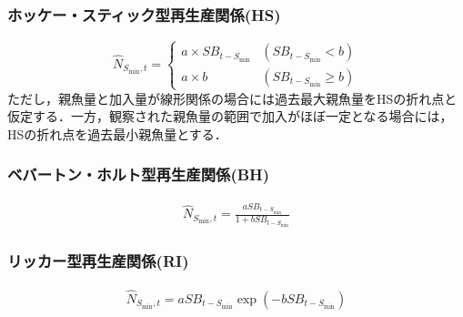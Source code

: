 \documentclass[11pt]{jsarticle}
\begin{document}
\subsubsection*{ホッケー・スティック型再生産関係(HS)}
\begin{equation}
  \hat{N}_{S_{\mathrm{min}},t} = \begin{cases}
    a \times S\!B_{t-S_{\mathrm{min}}} & (S\!B_{t-S_{\mathrm{min}}} < b) \\
    a \times b                 & (S\!B_{t-S_{\mathrm{min}}} \geq b)
  \end{cases}
  \label{HS}
\end{equation}
ただし，親魚量と加入量が線形関係の場合には過去最大親魚量をHSの折れ点と仮定する．一方，観察された親魚量の範囲で加入がほぼ一定となる場合には，HSの折れ点を過去最小親魚量とする．

\subsubsection*{ベバートン・ホルト型再生産関係(BH)}
\begin{eqnarray}
  \hat{N}_{S_{\mathrm{min}},t}=\frac{a S\!B_{t-S_{\mathrm{min}}}}{1 + b S\!B_{t-S_{\mathrm{min}}}}
  \label{BH1}
\end{eqnarray}

\subsubsection*{リッカー型再生産関係(RI)}
\begin{eqnarray}
  \hat{N}_{S_{\mathrm{min}},t}= a S\!B_{t-S_{\mathrm{min}}}   \exp{(-b S\!B_{t-S_{\mathrm{min}}})}
  \label{RI1}
\end{eqnarray}

\end{document}
